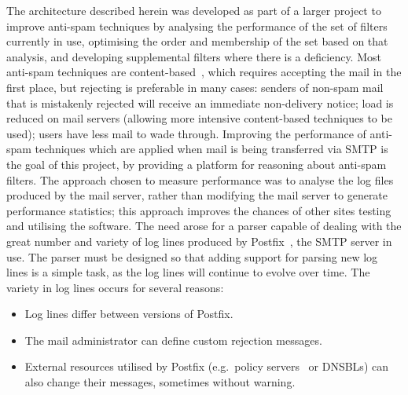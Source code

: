 \documentclass[draft]{svmult}
\begin{document}
The architecture described herein was developed as part of a larger project
to improve anti-spam techniques by analysing the performance of the set of
filters currently in use, optimising the order and membership of the set
based on that analysis, and developing supplemental filters where there is
a deficiency.  Most anti-spam techniques are
content-based~\cite{a-plan-for-spam, word-stemming, relaxed-online-svms},
which requires accepting the mail in the first place, but rejecting is
preferable in many cases: senders of non-spam mail that is mistakenly
rejected will receive an immediate non-delivery notice; load is reduced on
mail servers (allowing more intensive content-based techniques to be used);
users have less mail to wade through.  Improving the performance of
anti-spam techniques which are applied when mail is being transferred via
SMTP\footnotemark{} is the goal of this project, by providing a platform
for reasoning about anti-spam filters.  The approach chosen to measure
performance was to analyse the log files produced by the mail server,
rather than modifying the mail server to generate performance statistics;
this approach improves the chances of other sites testing and utilising the
software.  The need arose for a parser capable of dealing with the great
number and variety of log lines produced by Postfix~\cite{postfix}, the
SMTP server in use.  The parser must be designed so that adding support for
parsing new log lines is a simple task, as the log lines will continue to
evolve over time.  The variety in log lines occurs for several
reasons:

\begin{itemize}

    \item Log lines differ between versions of Postfix.
        
    \item The mail administrator can define custom rejection
        messages.

    \item External resources utilised by Postfix (e.g.\ policy
        servers~\cite{policy-servers} or DNSBLs) can also change their
        messages, sometimes without warning.

\end{itemize}
\end{document}
